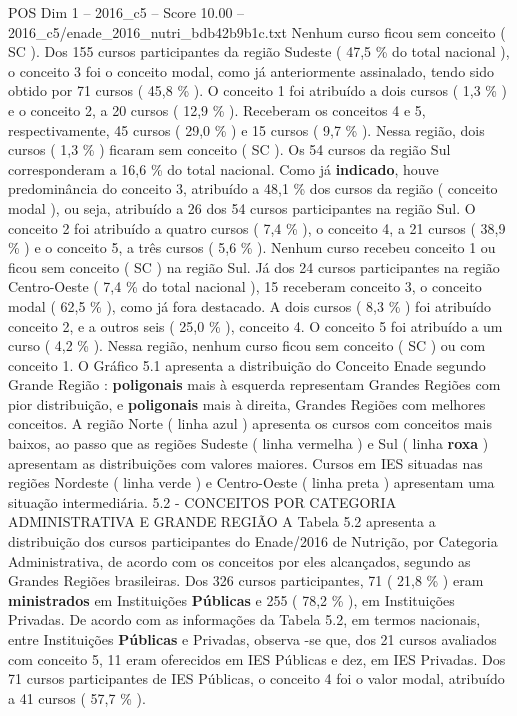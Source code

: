 \begin{textsample}{POS Dim 1 – 2016\_c5 – Score 10.00 – 2016\_c5/enade\_2016\_nutri\_bdb42b9b1c.txt}
Nenhum curso ficou sem conceito ( SC ).
Dos 155 cursos participantes da região Sudeste ( 47,5 \% do total nacional ), o conceito 3 foi o conceito modal, como já anteriormente assinalado, tendo sido obtido por 71 cursos ( 45,8 \% ).
O conceito 1 foi atribuído a dois cursos ( 1,3 \% ) e o conceito 2, a 20 cursos ( 12,9 \% ).
Receberam os conceitos 4 e 5, respectivamente, 45 cursos ( 29,0 \% ) e 15 cursos ( 9,7 \% ).
Nessa região, dois cursos ( 1,3 \% ) ficaram sem conceito ( SC ).
Os 54 cursos da região Sul corresponderam a 16,6 \% do total nacional.
Como já \textbf{indicado}, houve predominância do conceito 3, atribuído a 48,1 \% dos cursos da região ( conceito modal ), ou seja, atribuído a 26 dos 54 cursos participantes na região Sul.
O conceito 2 foi atribuído a quatro cursos ( 7,4 \% ), o conceito 4, a 21 cursos ( 38,9 \% ) e o conceito 5, a três cursos ( 5,6 \% ).
Nenhum curso recebeu conceito 1 ou ficou sem conceito ( SC ) na região Sul.
Já dos 24 cursos participantes na região Centro-Oeste ( 7,4 \% do total nacional ), 15 receberam conceito 3, o conceito modal ( 62,5 \% ), como já fora destacado.
A dois cursos ( 8,3 \% ) foi atribuído conceito 2, e a outros seis ( 25,0 \% ), conceito 4.
O conceito 5 foi atribuído a um curso ( 4,2 \% ).
Nessa região, nenhum curso ficou sem conceito ( SC ) ou com conceito 1.
O Gráfico 5.1 apresenta a distribuição do Conceito Enade segundo Grande Região : \textbf{poligonais} mais à esquerda representam Grandes Regiões com pior distribuição, e \textbf{poligonais} mais à direita, Grandes Regiões com melhores conceitos.
A região Norte ( linha azul ) apresenta os cursos com conceitos mais baixos, ao passo que as regiões Sudeste ( linha vermelha ) e Sul ( linha \textbf{roxa} ) apresentam as distribuições com valores maiores.
Cursos em IES situadas nas regiões Nordeste ( linha verde ) e Centro-Oeste ( linha preta ) apresentam uma situação intermediária. 5.2 - CONCEITOS POR CATEGORIA ADMINISTRATIVA E GRANDE REGIÃO A Tabela 5.2 apresenta a distribuição dos cursos participantes do Enade/2016 de Nutrição, por Categoria Administrativa, de acordo com os conceitos por eles alcançados, segundo as Grandes Regiões brasileiras.
Dos 326 cursos participantes, 71 ( 21,8 \% ) eram \textbf{ministrados} em Instituições \textbf{Públicas} e 255 ( 78,2 \% ), em Instituições Privadas.
De acordo com as informações da Tabela 5.2, em termos nacionais, entre Instituições \textbf{Públicas} e Privadas, observa -se que, dos 21 cursos avaliados com conceito 5, 11 eram oferecidos em IES Públicas e dez, em IES Privadas.
Dos 71 cursos participantes de IES Públicas, o conceito 4 foi o valor modal, atribuído a 41 cursos ( 57,7 \% ).

\end{textsample}
